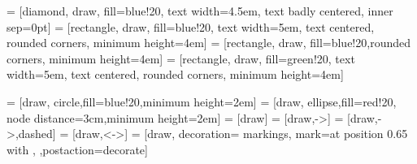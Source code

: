 
\newcommand{\vect}[1]{\overrightarrow{#1}}
\newcommand{\cross}[0]{\times}
\newcommand{\matt}[1]{\boldsymbol{#1}}
\newcommand{\transpose}{^T}
\newcommand{\unit}[1]{\, \mathrm{#1}}
\newcommand{\mathp}[1]{\,#1}

\newcommand{\future}[1]{{\color{red}\itshape#1}}

{%
  \inheritsavedanchors[from={rectangle}]%
  \inheritanchorborder[from={rectangle}]%
}

\tikzset{>=latex}
 = [diamond, draw, fill=blue!20, text width=4.5em, text badly centered, inner sep=0pt]
 = [rectangle, draw, fill=blue!20, text width=5em, text centered, rounded corners, minimum height=4em]
 = [rectangle, draw, fill=blue!20,rounded corners, minimum height=4em]
 = [rectangle, draw, fill=green!20, text width=5em, text centered, rounded corners, minimum height=4em]

 = [draw, circle,fill=blue!20,minimum height=2em]
 = [draw, ellipse,fill=red!20, node distance=3cm,minimum height=2em]
 = [draw]
 = [draw,->]
 = [draw,->,dashed]
 = [draw,<->]
 = [draw,%
          decoration={%
            markings,%
            mark=at position 0.65 with {},
          },postaction=decorate]
          
